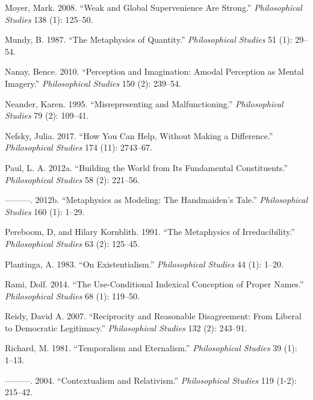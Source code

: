\documentclass[
  10pt,
  letterpaper,
  DIV=11,
  numbers=noendperiod,
  twoside]{scrartcl}
\newlength{\cslhangindent}
\newenvironment{CSLReferences}[2] %
 {\begin{list}{}{%
  \setlength{\itemindent}{0pt}
  \setlength{\leftmargin}{0pt}
  \setlength{\parsep}{0pt}
  \ifodd #1
   \setlength{\leftmargin}{\cslhangindent}
   \setlength{\itemindent}{-1\cslhangindent}
  \fi
  \setlength{\itemsep}{#2\baselineskip}}}
 {\end{list}}
\begin{document}
\begin{CSLReferences}{1}{0}
Moyer, Mark. 2008. {``Weak and Global Supervenience Are Strong.''}
\emph{Philosophical Studies} 138 (1): 125--50.

Mundy, B. 1987. {``The Metaphysics of Quantity.''} \emph{Philosophical
Studies} 51 (1): 29--54.

Nanay, Bence. 2010. {``Perception and Imagination: Amodal Perception as
Mental Imagery.''} \emph{Philosophical Studies} 150 (2): 239--54.

Neander, Karen. 1995. {``Misrepresenting and Malfunctioning.''}
\emph{Philosophical Studies} 79 (2): 109--41.

Nefsky, Julia. 2017. {``How You Can Help, Without Making a
Difference.''} \emph{Philosophical Studies} 174 (11): 2743--67.

Paul, L. A. 2012a. {``Building the World from Its Fundamental
Constituents.''} \emph{Philosophical Studies} 58 (2): 221--56.

---------. 2012b. {``Metaphysics as Modeling: The Handmaiden's Tale.''}
\emph{Philosophical Studies} 160 (1): 1--29.

Pereboom, D, and Hilary Kornblith. 1991. {``The Metaphysics of
Irreducibility.''} \emph{Philosophical Studies} 63 (2): 125--45.

Plantinga, A. 1983. {``On Existentialism.''} \emph{Philosophical
Studies} 44 (1): 1--20.

Rami, Dolf. 2014. {``The Use-Conditional Indexical Conception of Proper
Names.''} \emph{Philosophical Studies} 68 (1): 119--50.

Reidy, David A. 2007. {``Reciprocity and Reasonable Disagreement: From
Liberal to Democratic Legitimacy.''} \emph{Philosophical Studies} 132
(2): 243--91.

Richard, M. 1981. {``Temporalism and Eternalism.''} \emph{Philosophical
Studies} 39 (1): 1--13.

---------. 2004. {``Contextualism and Relativism.''} \emph{Philosophical
Studies} 119 (1-2): 215--42.


\end{CSLReferences}
\end{document}
